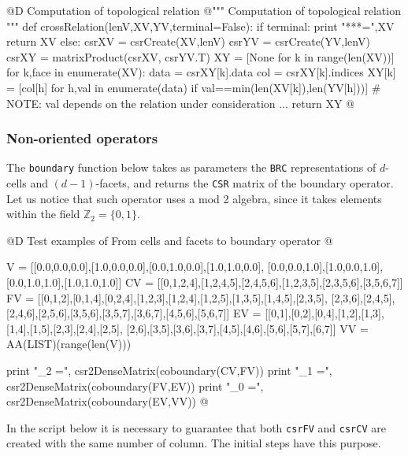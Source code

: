 \documentclass[11pt,oneside]{article}    %
\def\Z{\mathbb{Z}}
\begin{document}
@D Computation of topological relation
@{""" Computation of topological relation """
def crossRelation(lenV,XV,YV,terminal=False):
    if terminal:  
        print "\n****\nXV =",XV
        return XV
    else:
        csrXV = csrCreate(XV,lenV)
        csrYV = csrCreate(YV,lenV)
        csrXY = matrixProduct(csrXV, csrYV.T)
        XY = [None for k in range(len(XV))]
        for k,face in enumerate(XV):
            data = csrXY[k].data
            col = csrXY[k].indices
            XY[k] = [col[h] for h,val in enumerate(data) if val==min(len(XV[k]),len(YV[h]))]
            # NOTE: val depends on the relation under consideration ...
        return XY
@}


\subsubsection{Non-oriented operators}

The \texttt{boundary} function below takes as parameters the \texttt{BRC} representations of $d$-cells and $(d-1)$-facets, and returns the \texttt{CSR} matrix of the boundary operator. Let us notice that such operator uses a mod 2 algebra, since it takes elements within the field $\Z_2=\{0,1\}$.

@D Test examples of From cells and facets to boundary operator
@{V = [[0.0,0.0,0.0],[1.0,0.0,0.0],[0.0,1.0,0.0],[1.0,1.0,0.0],
       [0.0,0.0,1.0],[1.0,0.0,1.0],[0.0,1.0,1.0],[1.0,1.0,1.0]]
CV = [[0,1,2,4],[1,2,4,5],[2,4,5,6],[1,2,3,5],[2,3,5,6],[3,5,6,7]]
FV = [[0,1,2],[0,1,4],[0,2,4],[1,2,3],[1,2,4],[1,2,5],[1,3,5],[1,4,5],[2,3,5],
      [2,3,6],[2,4,5],[2,4,6],[2,5,6],[3,5,6],[3,5,7],[3,6,7],[4,5,6],[5,6,7]]
EV = [[0,1],[0,2],[0,4],[1,2],[1,3],[1,4],[1,5],[2,3],[2,4],[2,5],
      [2,6],[3,5],[3,6],[3,7],[4,5],[4,6],[5,6],[5,7],[6,7]]
VV = AA(LIST)(range(len(V)))

print "\ncoboundary_2 =\n", csr2DenseMatrix(coboundary(CV,FV))
print "\ncoboundary_1 =\n", csr2DenseMatrix(coboundary(FV,EV))
print "\ncoboundary_0 =\n", csr2DenseMatrix(coboundary(EV,VV))
@}

In the script below it is necessary to guarantee that both \texttt{csrFV} and \texttt{csrCV} are created with the same number of column. The initial steps have this purpose.
\end{document}
